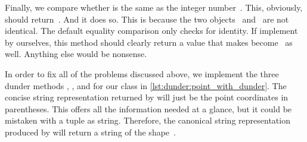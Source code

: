 Finally, we compare whether  is the same as the integer number~.
This, obviously, should return~.
And it does so.
This is because the two objects~ and~ are not identical.
The default equality comparison only checks for identity.
If implement  by ourselves, this method should clearly return a value that makes  become~ as well.
Anything else would be nonsense.

%
%
%

In order to fix all of the problems discussed above, we implement the three dunder methods , , and  for our  class in \cref{lst:dunder:point_with_dunder}.
The concise string representation returned by  will just be the point coordinates in parentheses.
This offers all the information needed at a glance, but it could be mistaken with a tuple as string.
Therefore, the canonical string representation produced by  will return a string of the shape~.

